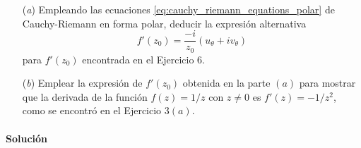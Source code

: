 \documentclass[a4paper]{report}
\begin{document}
\begin{enumerate}
 \item[(\textit{a})] Empleando las ecuaciones \ref{eq:cauchy_riemann_equations_polar} de Cauchy-Riemann en forma polar, deducir la expresión alternativa
 \begin{equation}\label{eq:f_derivative_polar_partial_theta}
  f'(z_0)=\frac{-i}{z_0}(u_\theta+iv_\theta)
 \end{equation}
 para \(f'(z_0)\) encontrada en el Ejercicio 6.
 \item[(\textit{b})] Emplear la expresión de \(f'(z_0)\) obtenida en la parte \((a)\) para mostrar que la derivada de la función \(f(z)=1/z\) con \(z\neq0\) es \(f'(z)=-1/z^2\), como se encontró en el Ejercicio 3\((a)\).
\end{enumerate}

\paragraph{Solución}
\end{document}
